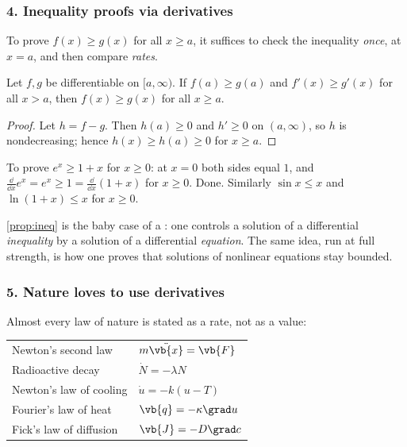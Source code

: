 \subsubsection*{4. Inequality proofs via derivatives}

To prove \(f(x) \geq g(x)\) for all \(x \geq a\), it suffices to check the inequality
\emph{once}, at \(x = a\), and then compare \emph{rates}.

\begin{proposition}\label{prop:ineq}
	Let \(f, g\) be differentiable on \([a, \infty)\). If \(f(a) \geq g(a)\) and
	\(f'(x) \geq g'(x)\) for all \(x > a\), then \(f(x) \geq g(x)\) for all \(x \geq a\).
\end{proposition}

\begin{proof}
	Let \(h = f - g\). Then \(h(a) \geq 0\) and \(h' \geq 0\) on \((a,\infty)\), so \(h\)
	is nondecreasing; hence \(h(x) \geq h(a) \geq 0\) for \(x \geq a\).
\end{proof}

\begin{eg}
	To prove \(e^{x} \geq 1 + x\) for \(x \geq 0\): at \(x = 0\) both sides equal \(1\),
	and \(\frac{\dd}{\dd x} e^{x} = e^{x} \geq 1 = \frac{\dd}{\dd x}(1+x)\) for
	\(x \geq 0\). Done. Similarly \(\sin x \leq x\) and \(\ln(1+x) \leq x\) for
	\(x \geq 0\).
\end{eg}

\begin{remark}
	\autoref{prop:ineq} is the baby case of a : one controls a
	solution of a differential \emph{inequality} by a solution of a differential
	\emph{equation}. The same idea, run at full strength, is how one proves that
	solutions of nonlinear equations stay bounded.
\end{remark}

\subsubsection*{5. Nature loves to use derivatives}

Almost every law of nature is stated as a rate, not as a value:
\begin{center}
	\begin{tabular}{@{}ll@{}}
		\toprule
		Newton's second law     & \(m \ddot{\vb{x}} = \vb{F}\)                       \\
		Radioactive decay       & \(\dot{N} = -\lambda N\)                           \\
		Newton's law of cooling & \(\dot{u} = -k(u - T)\)                            \\
		Fourier's law of heat   & \(\vb{q} = -\kappa \grad u\)                       \\
		Fick's law of diffusion & \(\vb{J} = -D \grad c\)                            \\
		\bottomrule
	\end{tabular}
\end{center}

